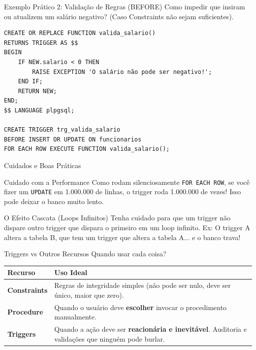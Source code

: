 \documentclass[9pt]{beamer}
\begin{document}
\begin{frame}[fragile]{Exemplo Prático 2: Validação de Regras (BEFORE)}
    Como impedir que insiram ou atualizem um salário negativo? (Caso Constraints não sejam suficientes).
    
    \begin{lstlisting}
CREATE OR REPLACE FUNCTION valida_salario()
RETURNS TRIGGER AS $$
BEGIN
    IF NEW.salario < 0 THEN
        RAISE EXCEPTION 'O salário não pode ser negativo!';
    END IF;
    RETURN NEW;
END;
$$ LANGUAGE plpgsql;

CREATE TRIGGER trg_valida_salario
BEFORE INSERT OR UPDATE ON funcionarios
FOR EACH ROW EXECUTE FUNCTION valida_salario();
    \end{lstlisting}
\end{frame}

\begin{frame}{Cuidados e Boas Práticas}
    \begin{block}{Cuidado com a Performance}
        Como rodam silenciosamente \texttt{FOR EACH ROW}, se você fizer um \texttt{UPDATE} em 1.000.000 de linhas, o trigger roda 1.000.000 de vezes! Isso pode deixar o banco muito lento.
    \end{block}
    
    \vspace{0.3cm}
    
    \begin{block}{O Efeito Cascata (Loops Infinitos)}
        Tenha cuidado para que um trigger não dispare outro trigger que dispara o primeiro em um loop infinito. Ex: O trigger A altera a tabela B, que tem um trigger que altera a tabela A... e o banco trava!
    \end{block}
\end{frame}

\begin{frame}{Triggers vs Outros Recursos}
    Quando usar cada coisa?
    
    \begin{center}
        \renewcommand{\arraystretch}{1.5}
        \begin{tabular}{|l|p{7cm}|}
            \hline
            \textbf{Recurso} & \textbf{Uso Ideal} \\
            \hline
            \textbf{Constraints} & Regras de integridade simples (não pode ser nulo, deve ser único, maior que zero). \\
            \hline
            \textbf{Procedure} & Quando o usuário deve \textbf{escolher} invocar o procedimento manualmente. \\
            \hline
            \textbf{Triggers} & Quando a ação deve ser \textbf{reacionária e inevitável}. Auditoria e validações que ninguém pode burlar. \\
            \hline
        \end{tabular}
    \end{center}
\end{frame}
\end{document}
